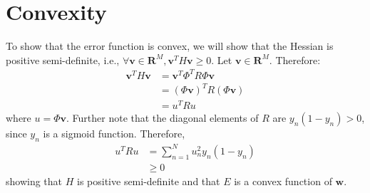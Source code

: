 \documentclass[a4paper, 11pt]{article}
\begin{document}
\section{Convexity}
To show that the error function is convex, we will show that the Hessian is positive semi-definite, i.e., $\forall \textbf{v} \in \mathbf{R}^M, \textbf{v}^T H \textbf{v} \geq 0$.
Let $\textbf{v} \in \mathbf{R}^M$. Therefore:
\begin{align}
    \textbf{v}^T H \textbf{v} &= \textbf{v}^T \Phi^T R \Phi \textbf{v} \\
    &= (\Phi \textbf{v})^T R (\Phi \textbf{v}) \\
    &= u^T R u
\end{align}
where $u = \Phi \textbf{v}$. Further note that the diagonal elements of $R$ are $y_n(1-y_n) > 0$, since $y_n$ is a sigmoid function. Therefore, 
\begin{align}
    u^T R u &= \sum_{n=1}^N u_n^2 y_n(1-y_n) \\
    &\geq 0
\end{align}
showing that $H$ is positive semi-definite and that $E$ is a convex function of $\textbf{w}$.
\end{document}
